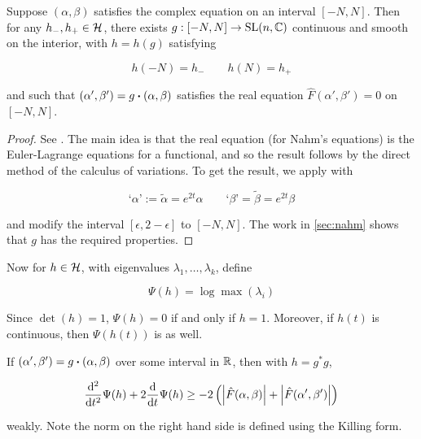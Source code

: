 \documentclass{report}
\begin{document}
\begin{lemma}
    \label{lem:gauge-exists-with-dirichlet}
    Suppose \((\alpha, \beta)\) satisfies the complex equation on an interval \([-N, N]\). Then for any \(h_-, h_+ \in \mathcal{H}\), there exists \(g : [-N, N] \to \operatorname{SL}(n, \mathbb{C})\) continuous and smooth on the interior, with \(h = h(g)\) satisfying

    \[h(-N) = h_- \qquad h(N) = h_+\]

    and such that \((\alpha', \beta') = g \vdot (\alpha, \beta)\) satisfies the real equation \(\hat F(\alpha', \beta') = 0\) on \([-N, N]\).
\end{lemma}

\begin{proof}
    See \cite[Proposition 2.8]{donaldson_nahms_1984}. The main idea is that the real equation (for Nahm's equations) is the Euler-Lagrange equations for a functional, and so the result follows by the direct method of the calculus of variations. To get the result, we apply \cite[Proposition 2.8]{donaldson_nahms_1984} with

    \[\text{`}\alpha\text{'} := \tilde \alpha = e^{2t}\alpha \qquad \text{`}\beta\text{'} = \tilde\beta = e^{2t}\beta\]

    and modify the interval \([\epsilon, 2-\epsilon]\) to \([-N, N]\). The work in \cref{sec:nahm} shows that \(g\) has the required properties.
\end{proof}

Now for \(h \in \mathcal{H}\), with eigenvalues \(\lambda_1, \dots, \lambda_k\), define

\[\Psi(h) = \log\max(\lambda_i)\]

Since \(\det(h) = 1\), \(\Psi(h) = 0\) if and only if \(h = 1\). Moreover, if \(h(t)\) is continuous, then \(\Psi(h(t))\) is as well.

\begin{lemma}
    \label{lem:differential-inequality}

    If \((\alpha', \beta') = g \vdot (\alpha, \beta)\) over some interval in \(\mathbb{R}\), then with \(h = g^*g\),

    \[\dv[2]{t}\Psi(h) + 2\dv{t}\Psi(h) \ge -2\left(\abs{\hat F(\alpha, \beta)} + \abs{\hat F(\alpha', \beta')}\right)\]

    weakly. Note the norm on the right hand side is defined using the Killing form.
\end{lemma}
\end{document}
